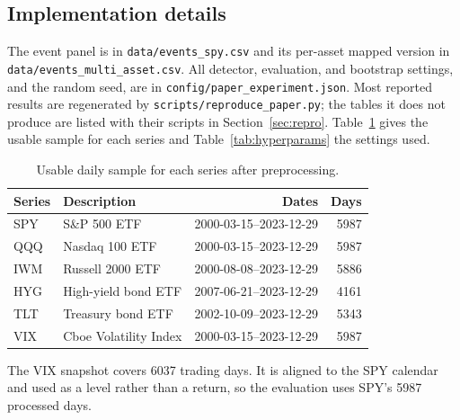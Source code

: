 \documentclass[pdflatex,sn-mathphys-num,iicol]{sn-jnl}
\begin{document}
\begin{appendices}
\renewcommand{\theHtable}{A.\arabic{table}}
\renewcommand{\theHfigure}{A.\arabic{figure}}
\renewcommand{\theHequation}{A.\arabic{equation}}

\section{Implementation details}
\label{app:implementation_details}
The event panel is in \texttt{data/events\_spy.csv} and its per-asset mapped version in \texttt{data/events\_multi\_asset.csv}. All detector, evaluation, and bootstrap settings, and the random seed, are in \texttt{config/paper\_experiment.json}. Most reported results are regenerated by \texttt{scripts/reproduce\_paper.py}; the tables it does not produce are listed with their scripts in Section~\ref{sec:repro}. Table~\ref{tab:asset_availability} gives the usable sample for each series and Table~\ref{tab:hyperparams} the settings used.

\begin{table}[t]
\centering
\caption{Usable daily sample for each series after preprocessing.}
\label{tab:asset_availability}
\scriptsize
\begin{tabular}{llrr}
\toprule
Series & Description & Dates & Days\\
\midrule
SPY & S\&P 500 ETF & 2000-03-15--2023-12-29 & 5987\\
QQQ & Nasdaq 100 ETF & 2000-03-15--2023-12-29 & 5987\\
IWM & Russell 2000 ETF & 2000-08-08--2023-12-29 & 5886\\
HYG & High-yield bond ETF & 2007-06-21--2023-12-29 & 4161\\
TLT & Treasury bond ETF & 2002-10-09--2023-12-29 & 5343\\
VIX & Cboe Volatility Index & 2000-03-15--2023-12-29 & 5987\\
\bottomrule
\end{tabular}
\end{table}

\noindent The VIX snapshot covers 6037 trading days. It is aligned to the SPY calendar and used as a level rather than a return, so the evaluation uses SPY's 5987 processed days.


\end{appendices}
\end{document}
